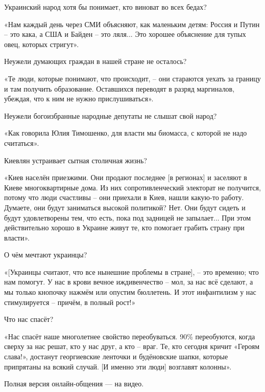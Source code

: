 Украинский народ хотя бы понимает, кто виноват во всех бедах?

«Нам каждый день через СМИ объясняют, как маленьким детям: Россия и Путин – это
кака, а США и Байден – это ляля... Это хорошее объяснение для тупых овец,
которых стригут».

Неужели думающих граждан в нашей стране не осталось?

«Те люди, которые понимают, что происходит, – они стараются уехать за границу и
там получить образование. Оставшихся переводят в разряд маргиналов, убеждая,
что к ним не нужно прислушиваться».

Неужели богоизбранные народные депутаты не слышат свой народ?

«Как говорила Юлия Тимошенко, для власти мы биомасса, с которой не надо
считаться».

Киевлян устраивает сытная столичная жизнь?

«Киев населён приезжими. Они продают последнее [в регионах] и заселяют в Киеве
многоквартирные дома. Из них сопротивленческий электорат не получится, потому
что люди счастливы – они приехали в Киев, нашли какую-то работу. Думаете, они
будут заниматься высокой политикой? Нет. Они будут сидеть и будут удовлетворены
тем, что есть, пока под задницей не запылает... При этом действительно хорошо в
Украине живут те, кто помогает грабить страну при власти».

О чём мечтают украинцы?

«[Украинцы считают, что все нынешние проблемы в стране], – это временно; что
нам помогут. У нас в крови вечное иждивенчество – мол, за нас всё сделают, а мы
только кнопочку нажмём или опустим бюллетень. И этот инфантилизм у нас
стимулируется – причём, в полный рост!»

Что нас спасёт?

«Нас спасёт наше многолетнее свойство переобуваться. 90\% переобуются, когда
сверху за нас решат, кто у нас друг, а кто – враг. Те, кто сегодня кричит
«Героям слава!», достанут георгиевские ленточки и будёновские шапки, которые
припрятаны на всякий случай. [И именно эти люди] возглавят колонны».

Полная версия онлайн-общения — на видео.

